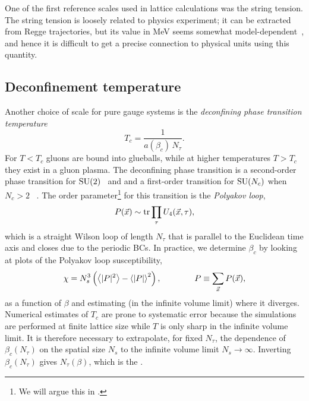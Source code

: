 One of the first reference scales used in lattice calculations was the string
tension. The string tension is loosely related to physics experiment; it can be
extracted from Regge trajectories, but its value in MeV seems somewhat
model-dependent~\cite{smit_introduction_2002}, and hence it is difficult
to get a precise connection to physical units using this quantity.


\subsection{Deconfinement temperature}


Another choice of scale for pure gauge systems is the 
{\it deconfining phase transition temperature}
\begin{equation}
  T_c=\frac{1}{a(\beta_c)\,N_\tau}.
\end{equation}
For $T<T_c$ gluons are bound into  glueballs, while 
at higher temperatures $T>T_c$ they exist in a gluon plasma. 
The deconfining phase transition is a second-order phase transition for 
$\operatorname{SU}(2)$~\cite{engels_critical_1996} and
and a first-order transition for $\operatorname{SU}(N_c)$ when $N_c>2$
~\cite{svetitsky_critical_1982}. 
The order parameter\footnote{We will argue this in .} 
for this transition is the 
{\it Polyakov loop},
\begin{equation}
  P(\vec{x})\sim\tr\prod_\tau U_4(\vec{x},\tau),
\end{equation}
which is a straight Wilson loop of length $N_\tau$ that is 
parallel to the Euclidean time 
axis and closes due to the periodic BCs. 
In practice, 
we determine $\beta_c$ by looking at plots of the Polyakov loop 
susceptibility,
\begin{equation}
  \chi=N_s^3\left(\ev{|P|^2}-\ev{|P|}^2\right), \qquad\qquad 
    P\equiv\sum\limits_{\vec{x}}P(\vec{x}),
\end{equation}
as a function of $\beta$ and estimating (in the infinite volume limit)
where it diverges. Numerical estimates
of $T_c$ are prone to systematic error because the simulations are
performed at finite lattice size while $T$ is only sharp in the infinite
volume limit. It is therefore necessary to extrapolate, for fixed $N_{\tau}$,
the dependence of $\beta_c(N_\tau)$ on the spatial size $N_s$ to the
infinite volume limit $N_s\to\infty$. Inverting $\beta_c(N_\tau)$ gives
$N_\tau(\beta)$, which is the 
.


